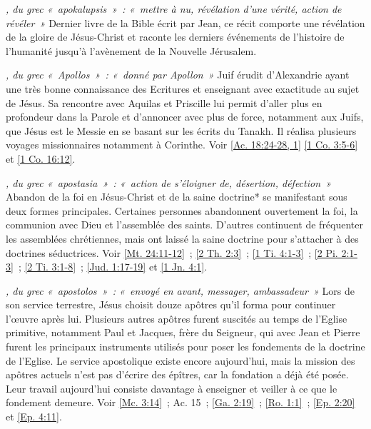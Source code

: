 \begin{multicols}{2}
\textit{, du grec «~apokalupsis~»~: «~mettre à nu, révélation d'une vérité, action de révéler~»}\newline
Dernier livre de la Bible écrit par Jean, ce récit comporte une révélation de la gloire de Jésus-Christ et raconte les derniers événements de l'histoire de l'humanité jusqu'à l'avènement de la Nouvelle Jérusalem.

\textit{, du grec «~Apollos~»~: «~donné par Apollon~»}\newline
Juif érudit d'Alexandrie ayant une très bonne connaissance des Ecritures et enseignant avec exactitude au sujet de Jésus. Sa rencontre avec Aquilas et Priscille lui permit d'aller plus en profondeur dans la Parole et d'annoncer avec plus de force, notamment aux Juifs, que Jésus est le Messie en se basant sur les écrits du Tanakh. Il réalisa plusieurs voyages missionnaires notamment à Corinthe. Voir \vref{Ac. 18:24-28, 1} \vref{1 Co. 3:5-6} et \vref{1 Co. 16:12}.

\textit{, du grec «~apostasia~»~: «~action de s'éloigner de, désertion, défection~»}\newline
Abandon de la foi en Jésus-Christ et de la saine doctrine* se manifestant sous deux formes principales. Certaines personnes abandonnent ouvertement la foi, la communion avec Dieu et l'assemblée des saints. D'autres continuent de fréquenter les assemblées chrétiennes, mais ont laissé la saine doctrine pour s'attacher à des doctrines séductrices. Voir \vref{Mt. 24:11-12}~; \vref{2 Th. 2:3}~; \vref{1 Ti. 4:1-3}~; \vref{2 Pi. 2:1-3}~; \vref{2 Ti. 3:1-8}~; \vref{Jud. 1:17-19} et \vref{1 Jn. 4:1}.

\textit{, du grec «~apostolos~»~: «~envoyé en avant, messager, ambassadeur~»}\newline
Lors de son service terrestre, Jésus choisit douze apôtres qu'il forma pour continuer l'œuvre après lui. Plusieurs autres apôtres furent suscités au temps de l'Eglise primitive, notamment Paul et Jacques, frère du Seigneur, qui avec Jean et Pierre furent les principaux instruments utilisés pour poser les fondements de la doctrine de l'Eglise. Le service apostolique existe encore aujourd'hui, mais la mission des apôtres actuels n'est pas d'écrire des épîtres, car la fondation a déjà été posée. Leur travail aujourd'hui consiste davantage à enseigner et veiller à ce que le fondement demeure. Voir \vref{Mc. 3:14}~; Ac. 15~; \vref{Ga. 2:19}~; \vref{Ro. 1:1}~; \vref{Ep. 2:20} et \vref{Ep. 4:11}.


\end{multicols}
